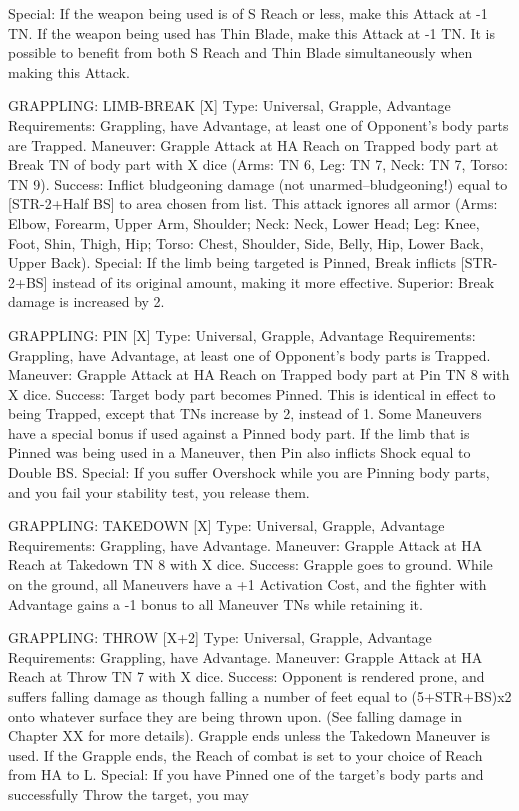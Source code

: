 \documentclass[oneside,11pt,english]{book}
\begin{document}
Special: If the weapon being used is of S Reach or less, make this Attack at -1 TN. If the weapon being 
used has Thin Blade, make this Attack at -1 TN. It is possible to benefit from both S Reach and Thin 
Blade simultaneously when making this Attack. 

 

GRAPPLING: LIMB-BREAK [X] 
Type: Universal, Grapple, Advantage 
Requirements: Grappling, have Advantage, at least one of Opponent's body parts are Trapped. 
Maneuver: Grapple Attack at HA Reach on Trapped body part at Break TN of body part with X dice 
(Arms: TN 6, Leg: TN 7, Neck: TN 7, Torso: TN 9). 
Success: Inflict bludgeoning damage (not unarmed--bludgeoning!) equal to [STR-2+Half BS] to area 
chosen from list. This attack ignores all armor (Arms: Elbow, Forearm, Upper Arm, Shoulder; Neck: 
Neck, Lower Head; Leg: Knee, Foot, Shin, Thigh, Hip; Torso: Chest, Shoulder, Side, Belly, Hip, Lower 
Back, Upper Back). 
Special: If the limb being targeted is Pinned, Break inflicts [STR-2+BS] instead of its original amount, 
making it more effective. 
Superior: Break damage is increased by 2. 

 

GRAPPLING: PIN [X] 
Type: Universal, Grapple, Advantage 
Requirements: Grappling, have Advantage, at least one of Opponent's body parts is Trapped. 
Maneuver: Grapple Attack at HA Reach on Trapped body part at Pin TN 8 with X dice. 
Success: Target body part becomes Pinned. This is identical in effect to being Trapped, except that TNs 
increase by 2, instead of 1. Some Maneuvers have a special bonus if used against a Pinned body part. If 
the limb that is Pinned was being used in a Maneuver, then Pin also inflicts Shock equal to Double BS. 
Special: If you suffer Overshock while you are Pinning body parts, and you fail your stability test, you 
release them. 

 

GRAPPLING: TAKEDOWN [X] 
Type: Universal, Grapple, Advantage 
Requirements: Grappling, have Advantage. 
Maneuver: Grapple Attack at HA Reach at Takedown TN 8 with X dice. 
Success: Grapple goes to ground. While on the ground, all Maneuvers have a +1 Activation Cost, and the 
fighter with Advantage gains a -1 bonus to all Maneuver TNs while retaining it. 

 

GRAPPLING: THROW [X+2] 
Type: Universal, Grapple, Advantage 
Requirements: Grappling, have Advantage. 
Maneuver: Grapple Attack at HA Reach at Throw TN 7 with X dice. 
Success: Opponent is rendered prone, and suffers falling damage as though falling a number of feet equal 
to (5+STR+BS)x2 onto whatever surface they are being thrown upon. (See falling damage in Chapter XX 
for more details). 
Grapple ends unless the Takedown Maneuver is used. If the Grapple ends, the Reach of combat is set to 
your choice of Reach from HA to L. 
Special: If you have Pinned one of the target's body parts and successfully Throw the target, you may 
\end{document}
